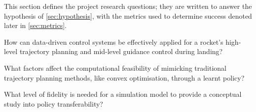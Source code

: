 This section defines the project research questions; they are written to answer the hypothesis of \autoref{sec:hypothesis}, with the metrics used to determine success denoted later in \autoref{sec:metrics}.

\begin{tcolorbox}[title={\textbf{Research question 1}}]
How can data-driven control systems be effectively applied for a rocket’s high-level trajectory planning and mid-level guidance control during landing?
\end{tcolorbox}

\begin{tcolorbox}[title={\textbf{Research question 2}}]
What factors affect the computational feasibility of mimicking traditional trajectory planning methods, like convex optimisation, through a learnt policy?
\end{tcolorbox}

\begin{tcolorbox}[title={\textbf{Research question 3}}]
What level of fidelity is needed for a simulation model to provide a conceptual study into policy transferability?
\end{tcolorbox}

